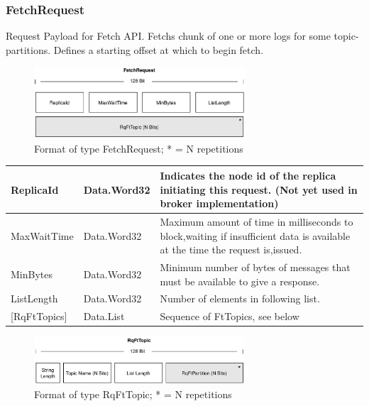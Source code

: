 \subsubsection{FetchRequest}
\label{subsubsec:protocol-fetchrequest}

Request Payload for Fetch API. Fetchs chunk of one or more logs for some
topic-partitions. Defines a starting offset at which to begin fetch. 

\begin{figure}[H]
    \centering
    \includegraphics[width=0.7\textwidth]{images/impl-prot-types-fetchRequest.png}
    \caption{Format of type FetchRequest; * = N repetitions }
    \label{fig:impl-prot-types-fetchRequest}
\end{figure}

\begin{table}[H]
\centering
\begin{tabular}{ l  l  p{11cm} }
\hline
ReplicaId      & Data.Word32 & Indicates the node id of the replica initiating this request. (Not yet used in broker implementation)                        \\ \hline
MaxWaitTime    & Data.Word32 & Maximum amount of time in milliseconds to block,waiting if insufficient data is available at the time the request is,issued. \\ \hline
MinBytes       & Data.Word32 & Minimum number of bytes of messages that must be available to give a response.                                               \\ \hline
ListLength     & Data.Word32 & Number of elements in following list.                                                                                        \\ \hline
{[}RqFtTopics{]} & Data.List   & Sequence of FtTopics, see below                                                                                              \\ \hline
\end{tabular}
\end{table}

\begin{figure}[H]
    \centering
    \includegraphics[width=0.7\textwidth]{images/impl-prot-types-ftTopic.png}
    \caption{Format of type RqFtTopic; * = N repetitions }
    \label{fig:impl-prot-types-ftTopic}
\end{figure}

